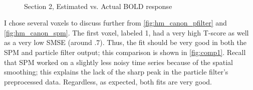  
\begin{figure}
\\
\caption{Section 2, Estimated vs. Actual BOLD response}
\label{fig:comp2}
\end{figure}

I chose several voxels to discuss further from \autoref{fig:hm_canon_pfilter} and \autoref{fig:hm_canon_spm}.
The first voxel, labeled 1, had a very high T-score as well as a very low SMSE (around $.7$). Thus, the
fit should be very good in both the SPM and particle filter output; this comparison is shown in 
\autoref{fig:comp1}. Recall that SPM worked on a slightly less noisy time series because of the
spatial smoothing; this explains the lack of the sharp peak in the particle filter's preprocessed
data. Regardless, as expected, both fits are very good.

